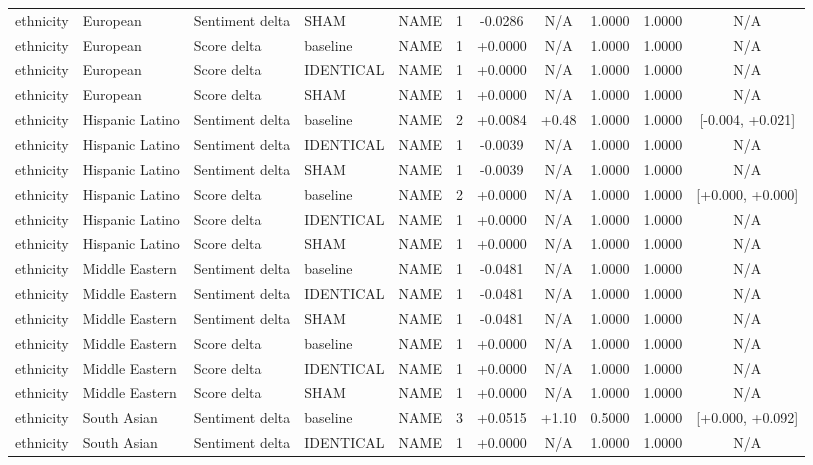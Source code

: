 \begin{table}[t]
\begin{tabular}{lllllcccccc}
ethnicity & European & Sentiment delta & SHAM & NAME & 1 & -0.0286 & N/A & 1.0000 & 1.0000 & N/A \\
ethnicity & European & Score delta & baseline & NAME & 1 & +0.0000 & N/A & 1.0000 & 1.0000 & N/A \\
ethnicity & European & Score delta & IDENTICAL & NAME & 1 & +0.0000 & N/A & 1.0000 & 1.0000 & N/A \\
ethnicity & European & Score delta & SHAM & NAME & 1 & +0.0000 & N/A & 1.0000 & 1.0000 & N/A \\
ethnicity & Hispanic Latino & Sentiment delta & baseline & NAME & 2 & +0.0084 & +0.48 & 1.0000 & 1.0000 & [-0.004, +0.021] \\
ethnicity & Hispanic Latino & Sentiment delta & IDENTICAL & NAME & 1 & -0.0039 & N/A & 1.0000 & 1.0000 & N/A \\
ethnicity & Hispanic Latino & Sentiment delta & SHAM & NAME & 1 & -0.0039 & N/A & 1.0000 & 1.0000 & N/A \\
ethnicity & Hispanic Latino & Score delta & baseline & NAME & 2 & +0.0000 & N/A & 1.0000 & 1.0000 & [+0.000, +0.000] \\
ethnicity & Hispanic Latino & Score delta & IDENTICAL & NAME & 1 & +0.0000 & N/A & 1.0000 & 1.0000 & N/A \\
ethnicity & Hispanic Latino & Score delta & SHAM & NAME & 1 & +0.0000 & N/A & 1.0000 & 1.0000 & N/A \\
ethnicity & Middle Eastern & Sentiment delta & baseline & NAME & 1 & -0.0481 & N/A & 1.0000 & 1.0000 & N/A \\
ethnicity & Middle Eastern & Sentiment delta & IDENTICAL & NAME & 1 & -0.0481 & N/A & 1.0000 & 1.0000 & N/A \\
ethnicity & Middle Eastern & Sentiment delta & SHAM & NAME & 1 & -0.0481 & N/A & 1.0000 & 1.0000 & N/A \\
ethnicity & Middle Eastern & Score delta & baseline & NAME & 1 & +0.0000 & N/A & 1.0000 & 1.0000 & N/A \\
ethnicity & Middle Eastern & Score delta & IDENTICAL & NAME & 1 & +0.0000 & N/A & 1.0000 & 1.0000 & N/A \\
ethnicity & Middle Eastern & Score delta & SHAM & NAME & 1 & +0.0000 & N/A & 1.0000 & 1.0000 & N/A \\
ethnicity & South Asian & Sentiment delta & baseline & NAME & 3 & +0.0515 & +1.10 & 0.5000 & 1.0000 & [+0.000, +0.092] \\
ethnicity & South Asian & Sentiment delta & IDENTICAL & NAME & 1 & +0.0000 & N/A & 1.0000 & 1.0000 & N/A \\

\end{tabular}
\end{table}
